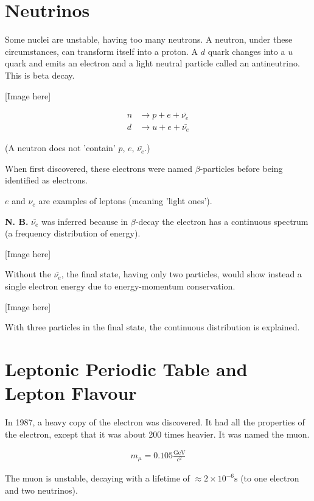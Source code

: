 \documentclass[10pt,a4paper]{article}
\begin{document}
\section*{Neutrinos}

Some nuclei are unstable, having too many neutrons. A neutron, under these circumstances, can transform itself into a proton. A $d$ quark changes into a $u$ quark and emits an electron and a light neutral particle called an antineutrino. This is beta decay.

[Image here]

\begin{align*}
n & \rightarrow p + e + \bar{\nu_e} \\
d & \rightarrow u + e + \bar{\nu_e}
\end{align*}

(A neutron does not 'contain' $p$, $e$, $\bar{\nu_e}$.)

When first discovered, these electrons were named $\beta$-particles before being identified as electrons.

$e$ and $\nu_e$ are examples of leptons (meaning 'light ones').

\textbf{N. B.} $\bar{\nu_e}$ was inferred because in $\beta$-decay the electron has a continuous spectrum (a frequency distribution of energy).

[Image here]

Without the $\bar{\nu_e}$, the final state, having only two particles, would show instead a single electron energy due to energy-momentum conservation.

[Image here]

With three particles in the final state, the continuous distribution is explained.

\section*{Leptonic Periodic Table and Lepton Flavour}

In 1987, a heavy copy of the electron was discovered. It had all the properties of the electron, except that it was about 200 times heavier. It was named the muon.

\begin{align*}
m_{\mu} = 0.105 \frac{\mathrm{GeV}}{c^2}
\end{align*}

The muon is unstable, decaying with a lifetime of $\approx 2 \times 10^{-6} \mathrm{s}$ (to one electron and two neutrinos).
\end{document}
